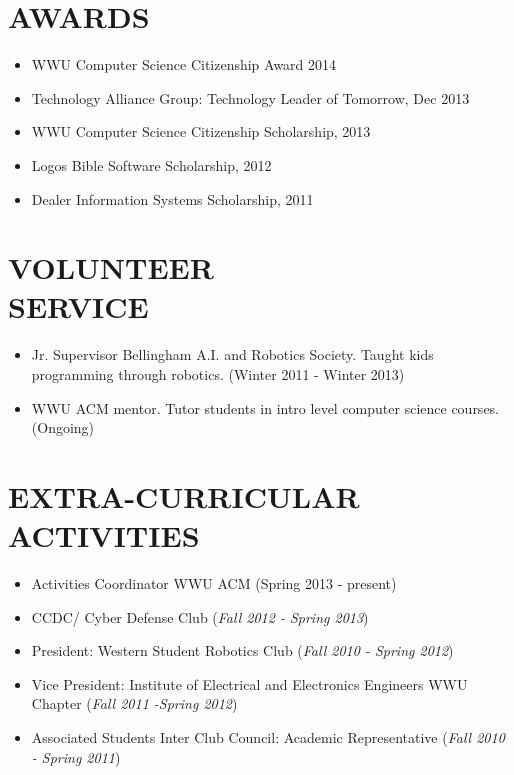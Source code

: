 \documentclass[line,margin]{res}
\begin{document}
\begin{resume}

	
\section{AWARDS}
	\begin{itemize} \itemsep -1pt
		\item WWU Computer Science Citizenship Award 2014
		\item Technology Alliance Group: Technology Leader of Tomorrow, Dec 2013
		\item WWU Computer Science Citizenship Scholarship, 2013
		\item Logos Bible Software Scholarship, 2012
		\item Dealer Information Systems Scholarship, 2011
	\end{itemize}
 
\section{VOLUNTEER \\ SERVICE}
		\begin{itemize} \itemsep -1pt
			\item Jr. Supervisor Bellingham A.I. and Robotics Society.  Taught kids programming through robotics. (Winter 2011 - Winter 2013)
			\item WWU ACM mentor.  Tutor students in intro level computer science courses.  (Ongoing)
		\end{itemize}

\section{EXTRA-CURRICULAR \\ ACTIVITIES} 
	\begin{itemize} \itemsep -1pt
	\item Activities Coordinator WWU ACM (Spring 2013 - present)
	\item CCDC/ Cyber Defense Club ({\sl Fall 2012 - Spring 2013})
	\item President: Western Student Robotics Club ({\sl Fall 2010 - Spring 2012})
 	\item Vice President: Institute of Electrical and Electronics Engineers WWU Chapter ({\sl Fall 2011 -Spring 2012})
	\item Associated Students Inter Club Council: Academic Representative ({\sl Fall 2010 - Spring 2011})
	\end{itemize}
\end{resume}
\end{document}
